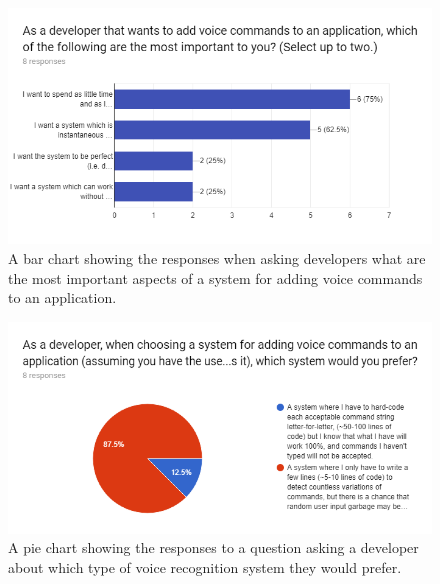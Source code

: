 \documentclass[11pt]{article}
\begin{document}
\begin{appendices}
\begin{center}
\begin{figure}[H]
\begin{center}
  \includegraphics[width=\linewidth]{survey-important}
  \caption{A bar chart showing the responses when asking developers what are the most important aspects of a system for adding voice commands to an application.}
  \label{fig:survey-important}
  \end{center}
\end{figure}
\end{center}

\begin{center}
\begin{figure}[H]
\begin{center}
  \includegraphics[width=\linewidth]{survey-tradeoff}
  \caption{A pie chart showing the responses to a question asking a developer about which type of voice recognition system they would prefer.}
  \label{fig:survey-tradeoff}
  \end{center}
\end{figure}
\end{center}


\end{appendices}
\end{document}
